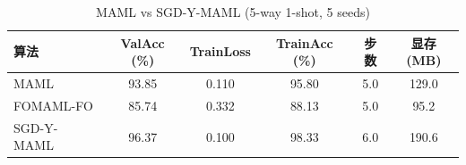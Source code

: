 \begin{table}[h]
\centering
\caption{MAML vs SGD-Y-MAML (5-way 1-shot, 5 seeds)}
\label{tab:comparison}
\begin{tabular}{lccccc}
\toprule
算法 & ValAcc (\%) & TrainLoss & TrainAcc (\%) & 步数 & 显存(MB) \\
\midrule
MAML & 93.85 & 0.110 & 95.80 & 5.0 & 129.0 \\
FOMAML-FO & 85.74 & 0.332 & 88.13 & 5.0 & 95.2 \\
SGD-Y-MAML & 96.37 & 0.100 & 98.33 & 6.0 & 190.6 \\
\bottomrule
\end{tabular}
\end{table}

